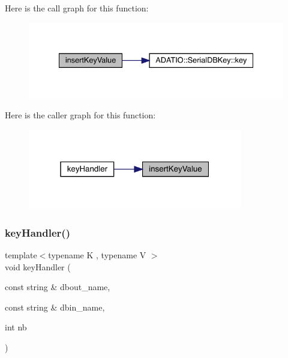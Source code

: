 Here is the call graph for this function\+:
\nopagebreak
\begin{figure}[H]
\begin{center}
\leavevmode
\includegraphics[width=334pt]{d4/dbc/adat-devel_2main_2dbutil_2dbbin_8cc_a8dcef9d29a9dfc5045f4ee378e94fca3_cgraph}
\end{center}
\end{figure}
Here is the caller graph for this function\+:
\nopagebreak
\begin{figure}[H]
\begin{center}
\leavevmode
\includegraphics[width=265pt]{d4/dbc/adat-devel_2main_2dbutil_2dbbin_8cc_a8dcef9d29a9dfc5045f4ee378e94fca3_icgraph}
\end{center}
\end{figure}
\mbox{\label{adat-devel_2main_2dbutil_2dbbin_8cc_accb30c2dbf14041f0de262e403fdace9}} 
\subsubsection{\texorpdfstring{keyHandler()}{keyHandler()}}
{\footnotesize\ttfamily template$<$typename K , typename V $>$ \\
void key\+Handler (\begin{DoxyParamCaption}\item[{const string \&}]{dbout\+\_\+name,  }\item[{const string \&}]{dbin\+\_\+name,  }\item[{int}]{nb }\end{DoxyParamCaption})}



